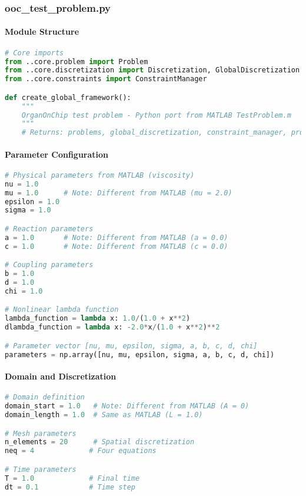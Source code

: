 \subsubsection{ooc\_test\_problem.py}

\paragraph{Module Structure}
\begin{lstlisting}[language=Python, caption=Python OoC Problem Structure]
# Core imports
from ..core.problem import Problem
from ..core.discretization import Discretization, GlobalDiscretization
from ..core.constraints import ConstraintManager

def create_global_framework():
    """
    OrganOnChip test problem - Python port from MATLAB TestProblem.m
    """
    # Returns: problems, global_discretization, constraint_manager, problem_name
\end{lstlisting}

\paragraph{Parameter Configuration}
\begin{lstlisting}[language=Python, caption=Python Parameter Setup]
# Physical parameters from MATLAB (viscosity)
nu = 1.0
mu = 1.0      # Note: Different from MATLAB (mu = 2.0)
epsilon = 1.0
sigma = 1.0

# Reaction parameters
a = 1.0       # Note: Different from MATLAB (a = 0.0)
c = 1.0       # Note: Different from MATLAB (c = 0.0)

# Coupling parameters
b = 1.0
d = 1.0
chi = 1.0

# Nonlinear lambda function
lambda_function = lambda x: 1.0/(1.0 + x**2)
dlambda_function = lambda x: -2.0*x/(1.0 + x**2)**2

# Parameter vector [nu, mu, epsilon, sigma, a, b, c, d, chi]
parameters = np.array([nu, mu, epsilon, sigma, a, b, c, d, chi])
\end{lstlisting}

\paragraph{Domain and Discretization}
\begin{lstlisting}[language=Python, caption=Python Domain Setup]
# Domain definition
domain_start = 1.0   # Note: Different from MATLAB (A = 0)
domain_length = 1.0  # Same as MATLAB (L = 1.0)

# Mesh parameters
n_elements = 20      # Spatial discretization
neq = 4             # Four equations

# Time parameters
T = 1.0             # Final time
dt = 0.1            # Time step
\end{lstlisting}

